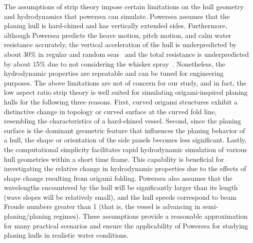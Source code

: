 The assumptions of strip theory impose certain limitations on the hull geometry and hydrodynamics that powersea can simulate. Powersea assumes that the planing hull is hard-chined and has vertically extended sides. Furthermore, although Powersea predicts the heave motion, pitch motion, and calm water resistance accurately, the vertical acceleration of the hull is underpredicted by about 30\% in regular and random seas~\cite{akers_dynamic_1999} and the total resistance is underpredicted by about 15\% due to not considering the whisker spray~\cite{whisker_savitsky_2007}. Nonetheless, the hydrodynamic properties are repeatable and can be tuned for engineering purposes. The above limitations are not of concern for our study, and in fact, the low aspect ratio strip theory is well suited for simulating origami-inspired planing hulls for the following three reasons. First, curved origami structures exhibit a distinctive change in topology or curved surface at the curved fold line, resembling the characteristics of a hard-chined vessel. Second, since the planing surface is the dominant geometric feature that influences the planing behavior of a hull, the shape or orientation of the side panels becomes less significant. Lastly, the computational simplicity facilitates rapid hydrodynamic simulation of various hull geometries within a short time frame. This capability is beneficial for investigating the relative change in hydrodynamic properties due to the effects of shape change resulting from origami folding. Powersea also assumes that the wavelengths encountered by the hull will be significantly larger than its length (wave slopes will be relatively small), and the hull speeds correspond to beam Froude numbers greater than 1 (that is, the vessel is advancing in semi-planing/planing regimes). These assumptions provide a reasonable approximation for many practical scenarios and ensure the applicability of Powersea for studying planing hulls in realistic water conditions.